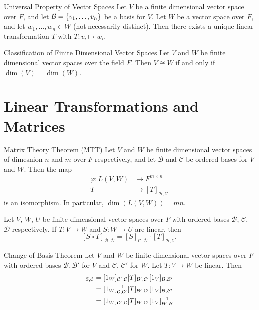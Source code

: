 \documentclass[class=article, crop=false]{standalone}
\begin{document}
  \begin{theorem}{Universal Property of Vector Spaces}
    Let $V$ be a finite dimensional vector space over $F$, and let $\mathcal{B} = \left\{v_1, \dotsc,v_n\right\}$ be a basis for $V$. Let $W$ be a vector space over $F$, and let $w_1,\dotsc,w_n\in W$ (not necessarily distinct). Then there exists a unique linear transformation $T$ with $T\colon v_i\mapsto w_i$.
  \end{theorem}
  \begin{theorem}{Classification of Finite Dimensional Vector Spaces}
    Let $V$ and $W$ be finite dimensional vector spaces over the field $F$. Then $V\cong W$ if and only if $\dim(V) = \dim(W)$.
  \end{theorem}
  \section{Linear Transformations and Matrices}
  \begin{theorem}{Matrix Theory Theorem (MTT)}
    Let $V$ and $W$ be finite dimensional vector spaces of dimesnion $n$ and $m$ over $F$ respectively, and let $\mathcal{B}$ and $\mathcal{C}$ be ordered bases for $V$ and $W$. Then the map
    \begin{align*}
      \varphi\colon L(V, W)&\to F^{m\times n} \\
      T &\mapsto [T]_{\mathcal{B},\mathcal{C}}
    \end{align*}
    is an isomorphism. In particular, $\dim(L(V,W)) = mn$.
  \end{theorem}
  \begin{theorem}{12.2}
    Let $V$, $W$, $U$ be finite dimensional vector spaces over $F$ with ordered bases $\mathcal{B}$, $\mathcal{C}$, $\mathcal{D}$ respectively. If $T\colon V\to W$ and $S\colon W\to U$ are linear, then
    \[
      [S\circ T]_{\mathcal{B}, \mathcal{D}} = [S]_{\mathcal{C},\mathcal{D}}\cdot [T]_{\mathcal{B},\mathcal{C}}.
    \]
  \end{theorem}
  \begin{theorem}{Change of Basis Theorem}
    Let $V$ and $W$ be finite dimensional vector spaces over $F$ with ordered bases $\mathcal{B}, \mathcal{B}'$ for $V$ and $\mathcal{C}$, $\mathcal{C}'$ for $W$. Let $T\colon V\to W$ be linear. Then
    \begin{align*}
      [T]_{\mathcal{B},\mathcal{C}} &= [1_W]_{\mathcal{C}',\mathcal{C}}[T]_{\mathcal{B}',\mathcal{C}'}[1_V]_{\mathcal{B},\mathcal{B}'} \\
      &= [1_W]_{\mathcal{C},\mathcal{C}'}\inv[T]_{\mathcal{B}',\mathcal{C}'}[1_V]_{\mathcal{B},\mathcal{B}'} \\
      &= [1_W]_{\mathcal{C}',\mathcal{C}}[T]_{\mathcal{B}',\mathcal{C}'}[1_V]_{\mathcal{B}',\mathcal{B}}\inv
    \end{align*}
  \end{theorem}
\end{document}
